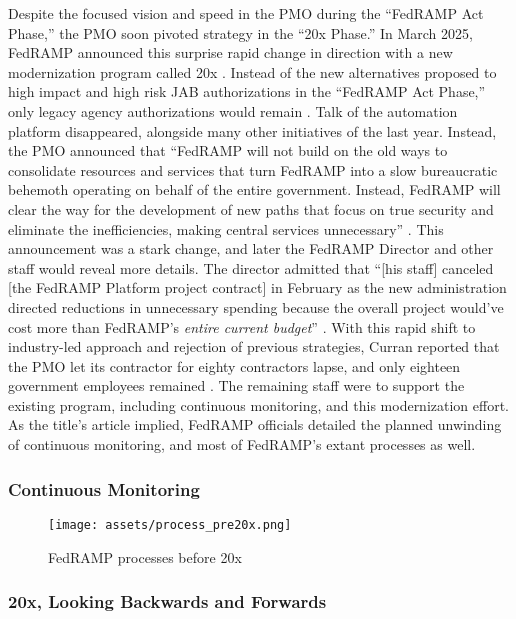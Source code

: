 \documentclass{jdf}
\begin{document}
Despite the focused vision and speed in the PMO during the ``FedRAMP Act Phase,'' the PMO soon pivoted strategy in the ``20x Phase.'' In March 2025, FedRAMP announced this surprise rapid change in direction with a new modernization program called 20x \citeyear{fedramp_blog_20x}. Instead of the new alternatives proposed to high impact and high risk JAB authorizations in the ``FedRAMP Act Phase,'' only legacy agency authorizations would remain \citeyear{fedramp_blog_20x}. Talk of the automation platform disappeared, alongside many other initiatives of the last year. Instead, the PMO announced that ``FedRAMP will not build on the old ways to consolidate resources and services that turn FedRAMP into a slow bureaucratic behemoth operating on behalf of the entire government. Instead, FedRAMP will clear the way for the development of new paths that focus on true security and eliminate the inefficiencies, making central services unnecessary'' \citeyear{fedramp_blog_20x}. This announcement was a stark change, and later the FedRAMP Director and other staff would reveal more details. The director admitted that ``[his staff] canceled [the FedRAMP Platform project contract] in February as the new administration directed reductions in unnecessary spending because the overall project would've cost more than FedRAMP's \textit{entire current budget}'' \citeyear{20x_waterman_platform_comment}. With this rapid shift to industry-led approach and rejection of previous strategies, Curran reported that the PMO let its contractor for eighty contractors lapse, and only eighteen government employees remained \citeyear{curran25}. The remaining staff were to support the existing program, including continuous monitoring, and this modernization effort. As the title's article implied, FedRAMP officials detailed the planned unwinding of continuous monitoring, and most of FedRAMP's extant processes as well.

\subsubsection{Continuous Monitoring} \label{conmon}

\begin{figure}[h!]
\centering
\texttt{[image: assets/process\_pre20x.png]}
\caption{FedRAMP processes before 20x}
\label{fig:conmon1}
\end{figure}

\subsubsection{20x, Looking Backwards and Forwards}
\end{document}
